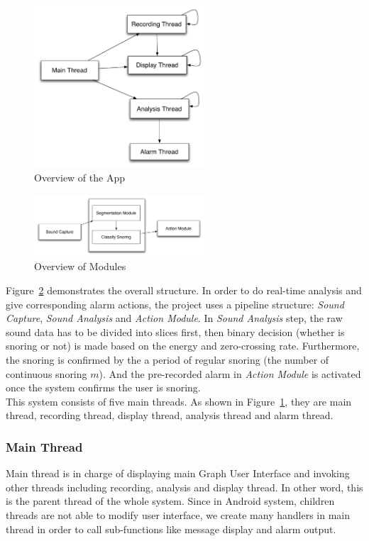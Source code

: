 \documentclass[conference]{IEEEtran}
\begin{document}
\begin{figure}[!t]
\centering
\includegraphics[width=2.5in]{system.pdf}
\caption{Overview of the App}
\label{fig:app_overview}
\end{figure}
\begin{figure}[!t]
\centering
\includegraphics[width=2.5in]{modules.pdf}
\caption{Overview of Modules}
\label{fig:app_modules}
\end{figure}
Figure~\ref{fig:app_modules} demonstrates the overall structure. In order to do real-time analysis and give corresponding alarm actions, the project uses a pipeline structure:  \emph{Sound Capture}, \emph{Sound Analysis} and \emph{Action Module}. In \emph{Sound Analysis} step, the raw sound data has to be divided into slices first, then binary decision (whether is snoring or not) is made based on the energy and zero-crossing rate. Furthermore, the snoring is confirmed by the a period of regular snoring (the number of continuous snoring \(m\)). And the pre-recorded alarm in \emph{Action Module} is activated once the system confirms the user is snoring. \\

This system consists of five main threads. As shown in Figure~\ref{fig:app_overview}, they are main thread, recording thread, display thread, analysis thread and alarm thread.

\subsubsection{Main Thread}
Main thread is in charge of displaying main Graph User Interface and invoking other threads including recording, analysis and display thread. In other word, this is the parent thread of the whole system. Since in Android system, children threads are not able to modify user interface, we create many handlers in main thread in order to call sub-functions like message display and alarm output.
\end{document}

